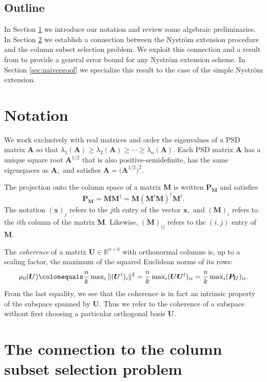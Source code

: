 \documentclass[11pt,letterpaper,twoside,reqno,nosumlimits]{amsart}
\newcommand{\mat}[1]{\ensuremath{\bm{#1}}}
\renewcommand{\vec}[1]{\ensuremath{\bm{#1}}}
\newcommand{\R}{\ensuremath{\mathbb{R}}}
\theoremstyle{remark}
\begin{document}
\subsection{Outline} In Section \ref{sec:notation} we introduce our notation and review some algebraic preliminaries. In Section \ref{sec:colselection} we establish a connection between the Nystr\"om extension procedure and the column subset selection problem. We exploit this connection and a result from \cite{HMT11} to provide a general error bound for any Nystr\"om extension scheme. In Section \ref{sec:naiveproof} we specialize this result to the case of the simple Nystr\"om extension.

\section{Notation}
\label{sec:notation}

We work exclusively with real matrices and order the eigenvalues of a PSD matrix $\mat{A}$ so that $\lambda_1(\mat{A}) \geq \lambda_2(\mat{A}) \geq \cdots \geq \lambda_n(\mat{A}).$ Each PSD matrix $\mat{A}$ has a unique square root $\mat{A}^{1/2}$ that is also positive-semidefinite, has the same eigenspaces as $\mat{A},$ and satisfies $\mat{A} = \big(\mat{A}^{1/2}\big)^2.$

The projection onto the column space of a matrix $\mat{M}$ is written $\mat{P}_{\mat{M}}$ and satisfies
\[
\mat{P}_{\mat{M}} = \mat{M}\mat{M}^\dagger = \mat{M} (\mat{M}^t \mat{M})^\dagger \mat{M}^t.
\]
The notation $(\vec{x})_j$ refers to the $j$th entry of the vector $\vec{x},$ and $(\mat{M})_i$ refers to the $i$th column of the matrix $\mat{M}.$ Likewise, $(\mat{M})_{ij}$ refers to the $(i,j)$ entry of $\mat{M}.$

The \emph{coherence} of a matrix $\mat{U} \in \R^{n\times k}$ with orthonormal columns is, up to a scaling factor, the maximum of the squared Euclidean norms of its rows:
\[
 \mu_0(\mat{U}) \colonequals \frac{n}{k} \max\nolimits_i \|(\mat{U}^t)_i\|^2 = \frac{n}{k} \max\nolimits_i (\mat{U}\mat{U}^t)_{ii} = \frac{n}{k} \max\nolimits_i (\mat{P}_{\mat{U}})_{ii}.
\]
From the last equality, we see that the coherence is in fact an intrinsic property of the subspace spanned by $\mat{U}.$ Thus we refer to the coherence of a subspace without first choosing a particular orthogonal basis $\mat{U}.$

\section{The connection to the column subset selection problem}
\label{sec:colselection}
\end{document}
